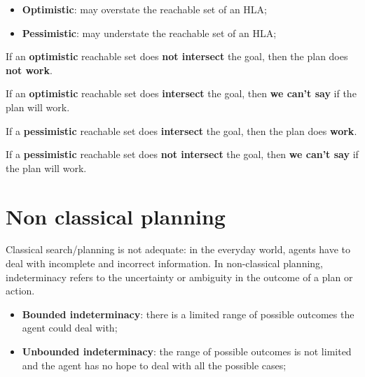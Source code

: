\documentclass{article}
\begin{document}
\begin{itemize}
\begin{itemize}
    \item \textbf{Optimistic}: may overstate the reachable set of an HLA;
    \item \textbf{Pessimistic}: may understate the reachable set of an HLA;
\end{itemize}

\begin{flushleft}
If an \textbf{optimistic} reachable set does \textbf{not intersect} the goal, then the plan does \textbf{not work}. \\
\end{flushleft}

\begin{flushleft}
If an \textbf{optimistic} reachable set does \textbf{intersect} the goal, then \textbf{we can't say} if the plan will work. \\
\end{flushleft}

\begin{flushleft}
If a \textbf{pessimistic} reachable set does \textbf{intersect} the goal, then the plan does \textbf{work}. \\
\end{flushleft}

\begin{flushleft}
If a \textbf{pessimistic} reachable set does \textbf{not intersect} the goal, then \textbf{we can't say} if the plan will work. \\
\end{flushleft}

\newpage

\section{Non classical planning}

Classical search/planning is not adequate: in the everyday world, agents have to deal with incomplete and incorrect information.
In non-classical planning, indeterminacy refers to the uncertainty or ambiguity in the outcome of a plan or action. 

\begin{itemize}
    \item \textbf{Bounded indeterminacy}: there is a limited range of possible outcomes the agent could deal with;
    \item \textbf{Unbounded indeterminacy}: the range of possible outcomes is not limited and the agent has no hope to deal with all the possible cases;
\end{itemize}



\end{itemize}
\end{document}
